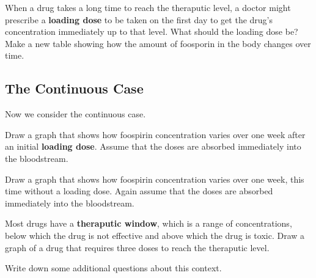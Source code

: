 \documentclass{ximera}
\begin{document}
 \begin{question}
 When a drug takes a long time to reach the theraputic level, a doctor
 might prescribe a \textbf{loading dose} to be taken on the first day
 to get the drug's concentration immediately up to that level.  What
 should the loading dose be?  Make a new table showing how the amount
 of foosporin in the body changes over time.
 \begin{freeResponse}
 \end{freeResponse}
 \end{question}

 \subsection{The Continuous Case}
 Now we consider the continuous case.  
 \begin{question}
 Draw a graph that shows how foospirin concentration varies over one week after an initial \textbf{loading dose}.  Assume that the doses are absorbed immediately into the bloodstream.  
 \begin{freeResponse}
 \end{freeResponse}
 \end{question}

 \begin{question}
 Draw a graph that shows how foospirin concentration varies over one week, this time without a loading dose.  Again assume that the doses are absorbed immediately into the bloodstream.  
 \begin{freeResponse}
 \end{freeResponse}
 \end{question}

 \begin{question}
 Most drugs have a \textbf{theraputic window}, which is a range of concentrations, below which the drug is not effective and above which the drug is toxic.  Draw a graph of a drug that requires three doses to reach the theraputic level.  
 \begin{freeResponse}
 \end{freeResponse}
 \end{question}

 \begin{question}
 Write down some additional questions about this context.       
 \begin{freeResponse}
 \end{freeResponse}
 \end{question}
\end{document}
